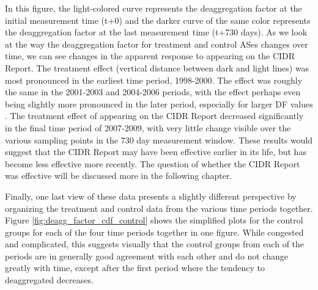 In this figure, the light-colored curve represents the deaggregation factor at
the initial measurement time (t+0) and the darker curve of the same color
represents the deaggregation factor at the last measurement time (t+730 days).
As we look at the way the deaggregation factor for treatment and control ASes
changes over time, we can see changes in the apparent response to appearing on
the CIDR Report. The treatment effect (vertical distance between dark and light
lines) was most pronounced in the earliest time period, 1998-2000. The effect
was roughly the same in the 2001-2003 and 2004-2006 periods, with the effect
perhaps even being slightly more pronounced in the later period, especially for
larger DF values . The treatment effect of appearing on the
CIDR Report decreased significantly in the final time period of 2007-2009, with
very little change visible over the various sampling points in the 730 day
measurement window. These results would suggest that the CIDR Report may have
been effective earlier in its life, but has become less effective more
recently. The question of whether the CIDR Report was effective will be
discussed more in the following chapter.

Finally, one last view of these data presents a slightly different perspective
by organizing the treatment and control data from the various time periods
together. Figure \ref{fig:deagg_factor_cdf_control} shows the simplified plots
for the control groups for each of the four time periods together in one
figure. While congested and complicated, this suggests visually that the
control groups from each of the periods are in generally good agreement with
each other and do not change greatly with time, except after the first period
where the tendency to deaggregated decreases.

